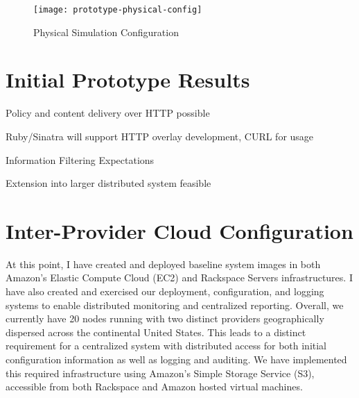 \begin{figure}[!t]
\centering
\texttt{[image: prototype-physical-config]}
\caption{Physical Simulation Configuration}
\label{fig:model:prototype-physical-config}
\end{figure}

\section{Initial Prototype Results}
\color{red}
Policy and content delivery over HTTP possible

Ruby/Sinatra will support HTTP overlay development, CURL for usage

Information Filtering Expectations

Extension into larger distributed system feasible
\color{black}

\section{Inter-Provider Cloud Configuration}
At this point, I have created and deployed baseline system images in both Amazon's Elastic Compute Cloud (EC2) and Rackspace Servers infrastructures.  I have also created and exercised our deployment, configuration, and logging systems to enable distributed monitoring and centralized reporting.  Overall, we currently have 20 nodes running with two distinct providers geographically dispersed across the continental United States.  This leads to a distinct requirement for a centralized system with distributed access for both initial configuration information as well as logging and auditing.  We have implemented this required infrastructure using Amazon's Simple Storage Service (S3), accessible from both Rackspace and Amazon hosted virtual machines.

